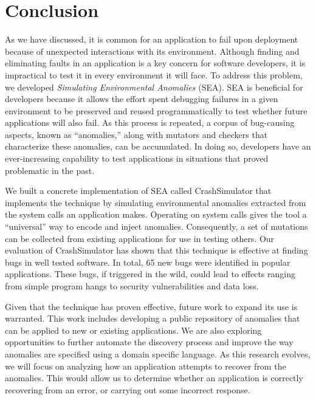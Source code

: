 \section{Conclusion}
\label{SEC:conclusion}

As we have discussed,
it is common for an application
to fail upon deployment because of unexpected interactions
with its environment.
Although finding and eliminating
faults in an application is a key concern for software developers, it is
impractical to test it in every environment it will face.
To address this problem, we developed \textit{Simulating Environmental
Anomalies} (SEA).
SEA is beneficial for developers because it allows
the effort spent debugging failures in a given environment
to be preserved and reused programmatically to test whether
future applications will also fail.
As this process is repeated,
a corpus of bug-causing aspects,
known as ``anomalies,''
along with mutators and checkers that characterize these anomalies,
can be accumulated. In doing so, developers have an ever-increasing capability
to test applications in situations
that proved problematic in the past.

We built a concrete implementation of SEA
called CrashSimulator that implements
the technique by simulating environmental
anomalies extracted from the system calls an application makes.
Operating on system calls gives the tool a ``universal'' way to
encode and inject anomalies. Consequently, a set of mutations can be
collected from existing applications for use in testing others.
Our evaluation of CrashSimulator
has shown that this technique is
effective at finding bugs in well tested software.
In total,
65 new bugs were identified in popular applications.
These bugs, if triggered in the wild,
could lead to effects ranging from simple program hangs
to security vulnerabilities and data loss.

Given that the technique has
proven effective, future work to expand its use is warranted. This work includes
developing a public repository of anomalies
that can be applied to new or existing applications.
We are also exploring
opportunities to further automate the discovery process
and improve the way anomalies are specified using a
domain specific language.
As this research evolves, we will focus on analyzing how an
application attempts
to recover from the anomalies.  This would allow
us to determine whether
an application is correctly recovering
from an error, or carrying out some incorrect response.
